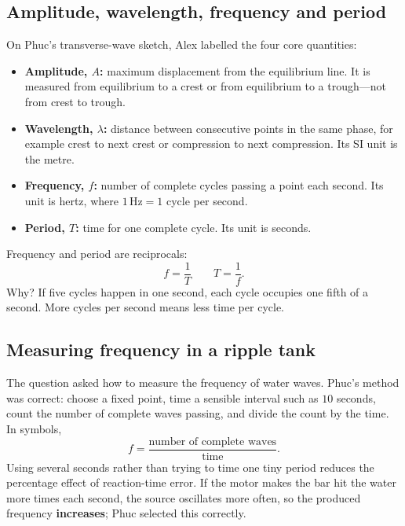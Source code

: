 \documentclass[11pt,a4paper]{article}
\begin{document}
\subsection*{Amplitude, wavelength, frequency and period}
On Phuc's transverse-wave sketch, Alex labelled the four core quantities:
\begin{itemize}
\item \textbf{Amplitude, $A$:} maximum displacement from the equilibrium line. It is measured from equilibrium to a crest or from equilibrium to a trough---not from crest to trough.
\item \textbf{Wavelength, $\lambda$:} distance between consecutive points in the same phase, for example crest to next crest or compression to next compression. Its SI unit is the metre.
\item \textbf{Frequency, $f$:} number of complete cycles passing a point each second. Its unit is hertz, where $1\,\mathrm{Hz}=1$ cycle per second.
\item \textbf{Period, $T$:} time for one complete cycle. Its unit is seconds.
\end{itemize}

\begin{center}
\end{center}

Frequency and period are reciprocals:
\[
\boxed{f=\frac{1}{T}}\qquad\boxed{T=\frac{1}{f}}.
\]
Why? If five cycles happen in one second, each cycle occupies one fifth of a second. More cycles per second means less time per cycle.

\subsection*{Measuring frequency in a ripple tank}
The question asked how to measure the frequency of water waves. Phuc's method was correct: choose a fixed point, time a sensible interval such as $10$ seconds, count the number of complete waves passing, and divide the count by the time. In symbols,
\[
f=\frac{\text{number of complete waves}}{\text{time}}.
\]
Using several seconds rather than trying to time one tiny period reduces the percentage effect of reaction-time error. If the motor makes the bar hit the water more times each second, the source oscillates more often, so the produced frequency \textbf{increases}; Phuc selected this correctly.
\end{document}
